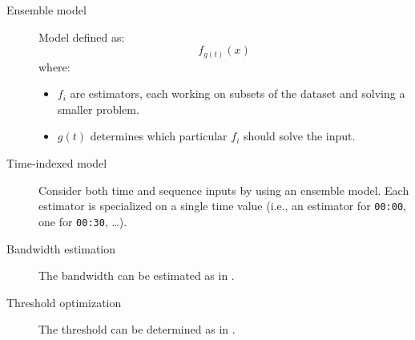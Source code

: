 \begin{description}
    \item[Ensemble model] 
        Model defined as:
        \[ f_{g(t)}(x) \]
        where:
        \begin{itemize}
            \item $f_i$ are estimators, each working on subsets of the dataset and solving a smaller problem.
            \item $g(t)$ determines which particular $f_i$ should solve the input.
        \end{itemize}

    \item[Time-indexed model]
        Consider both time and sequence inputs by using an ensemble model. Each estimator is specialized on a single time value (i.e., an estimator for \texttt{00:00}, one for \texttt{00:30}, \dots ).

    \item[Bandwidth estimation]
        The bandwidth can be estimated as in .

    \item[Threshold optimization]
        The threshold can be determined as in .
\end{description}
